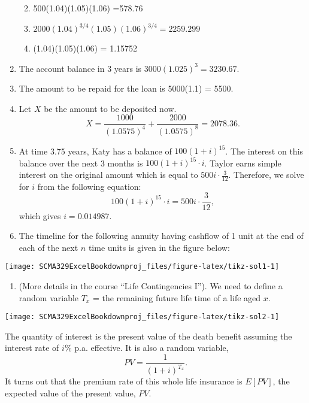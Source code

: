 \documentclass[
]{article}
\providecommand{\tightlist}{%
  \setlength{\itemsep}{0pt}\setlength{\parskip}{0pt}}
\theoremstyle{definition}
\theoremstyle{definition}
\theoremstyle{definition}
\theoremstyle{definition}
\theoremstyle{remark}
\begin{document}
\begin{enumerate}
  \begin{enumerate}
  \def\labelenumii{\arabic{enumii}.}
  \tightlist
  \item
    500(1.04)(1.05)(1.06) =578.76
  \item
    \(2000(1.04)^{3/4}(1.05)(1.06)^{3/4} =2259.299\)
  \item
    (1.04)(1.05)(1.06) = 1.15752
  \end{enumerate}
\item
  The account balance in 3 years is \(3000(1.025)^{3} = 3230.67\).
\item
  The amount to be repaid for the loan is 5000(1.1) = 5500.
\item
  Let \(X\) be the amount to be deposited now.
  \[X = \frac{1000}{(1.0575)^4} + \frac{2000}{(1.0575)^8} = 2078.36. \]
\item
  At time 3.75 years, Katy has a balance of \(100(1+i)^{15}\). The interest on this balance over the next 3 months is \(100(1+i)^{15}\cdot i\).
  Taylor earns simple interest on the original amount which is equal to \(500i\cdot\frac{3}{12}\). Therefore, we solve for \(i\) from the following equation:
  \[ 100(1+i)^{15}\cdot i = 500i\cdot\frac{3}{12},\] which gives \(i = 0.014987.\)
\item
  The timeline for the following annuity having cashflow of 1 unit at the end of each of the next \(n\) time units is given in the figure below:
\end{enumerate}

\begin{center}\texttt{[image: SCMA329ExcelBookdownproj\_files/figure-latex/tikz-sol1-1]} \end{center}

\begin{enumerate}
\def\labelenumi{\arabic{enumi}.}
\setcounter{enumi}{9}
\tightlist
\item
  (More details in the course ``Life Contingencies I''). We need to define a random variable \(T_x\) = the remaining future life time of a life aged \(x\).
\end{enumerate}

\begin{center}\texttt{[image: SCMA329ExcelBookdownproj\_files/figure-latex/tikz-sol2-1]} \end{center}

The quantity of interest is the present value of the death benefit assuming the interest rate of \(i\%\) p.a. effective. It is also a random variable,
\[PV = \frac{1}{(1+i)^{T_x}}.\] It turns out that the premium rate of this whole life insurance is \(E[PV]\), the expected value of the present value, \(PV\).
\end{document}
